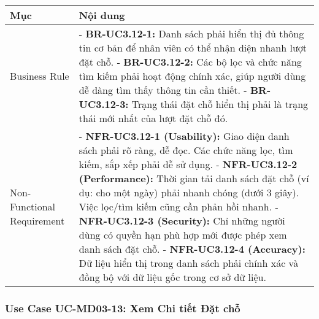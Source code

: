 \begin{longtable}{|m{4cm}|p{11cm}|}
\hline
\textbf{Mục} & \textbf{Nội dung} \\
\hline
Business Rule & - \textbf{BR-UC3.12-1:} Danh sách phải hiển thị đủ thông tin cơ bản để nhân viên có thể nhận diện nhanh lượt đặt chỗ. \newline - \textbf{BR-UC3.12-2:} Các bộ lọc và chức năng tìm kiếm phải hoạt động chính xác, giúp người dùng dễ dàng tìm thấy thông tin cần thiết. \newline - \textbf{BR-UC3.12-3:} Trạng thái đặt chỗ hiển thị phải là trạng thái mới nhất của lượt đặt chỗ đó. \\
\hline
Non-Functional Requirement & - \textbf{NFR-UC3.12-1 (Usability):} Giao diện danh sách phải rõ ràng, dễ đọc. Các chức năng lọc, tìm kiếm, sắp xếp phải dễ sử dụng. \newline - \textbf{NFR-UC3.12-2 (Performance):} Thời gian tải danh sách đặt chỗ (ví dụ: cho một ngày) phải nhanh chóng (dưới 3 giây). Việc lọc/tìm kiếm cũng cần phản hồi nhanh. \newline - \textbf{NFR-UC3.12-3 (Security):} Chỉ những người dùng có quyền hạn phù hợp mới được phép xem danh sách đặt chỗ. \newline - \textbf{NFR-UC3.12-4 (Accuracy):} Dữ liệu hiển thị trong danh sách phải chính xác và đồng bộ với dữ liệu gốc trong cơ sở dữ liệu. \\
\hline
\end{longtable}

\subsubsection{Use Case UC-MD03-13: Xem Chi tiết Đặt chỗ}

